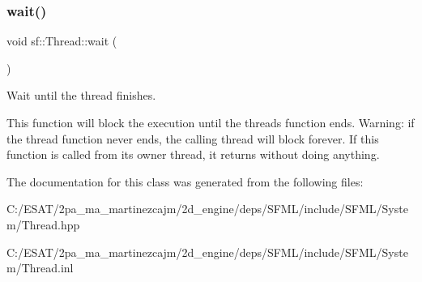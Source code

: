 \subsubsection{\texorpdfstring{wait()}{wait()}}
{\footnotesize\ttfamily void sf\+::\+Thread\+::wait (\begin{DoxyParamCaption}{ }\end{DoxyParamCaption})}



Wait until the thread finishes. 

This function will block the execution until the thread\textquotesingle{}s function ends. Warning\+: if the thread function never ends, the calling thread will block forever. If this function is called from its owner thread, it returns without doing anything. 

The documentation for this class was generated from the following files\+:\begin{DoxyCompactItemize}
\item 
C\+:/\+E\+S\+A\+T/2pa\+\_\+ma\+\_\+martinezcajm/2d\+\_\+engine/deps/\+S\+F\+M\+L/include/\+S\+F\+M\+L/\+System/Thread.\+hpp\item 
C\+:/\+E\+S\+A\+T/2pa\+\_\+ma\+\_\+martinezcajm/2d\+\_\+engine/deps/\+S\+F\+M\+L/include/\+S\+F\+M\+L/\+System/Thread.\+inl\end{DoxyCompactItemize}
